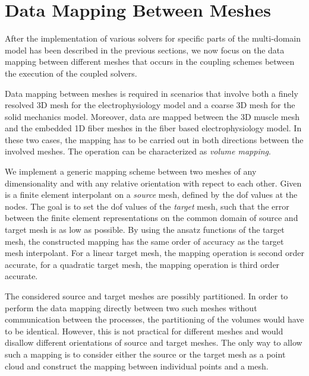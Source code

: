 
\section{Data Mapping Between Meshes}\label{sec:data_mapping_between_meshes}


After the implementation of various solvers for specific parts of the multi-domain model has been described in the previous sections, we now focus on the data mapping between different meshes that occurs in the coupling schemes between the execution of the coupled solvers. 

Data mapping between meshes is required in scenarios that involve both a finely resolved 3D mesh for the electrophysiology model and a coarse 3D mesh for the solid mechanics model. Moreover, data are mapped between the 3D muscle mesh and the embedded 1D fiber meshes in the fiber based electrophysiology model. In these two cases, the mapping has to be carried out in both directions between the involved meshes. The operation can be characterized as \emph{volume mapping}.

We implement a generic mapping scheme between two meshes of any dimensionality and with any relative orientation with repect to each other. 
Given is a finite element interpolant on a \emph{source} mesh, defined by the dof values at the nodes. The goal is to set the dof values of the \emph{target} mesh, such that the error between the finite element representations on the common domain of source and target mesh is as low as possible. By using the ansatz functions of the target mesh, the constructed mapping has the same order of accuracy as the target mesh interpolant. For a linear target mesh, the mapping operation is second order accurate, for a quadratic target mesh, the mapping operation is third order accurate.

The considered source and target meshes are possibly partitioned. In order to perform the data mapping directly between two such meshes without communication between the processes, the partitioning of the volumes would have to be identical. However, this is not practical for different meshes and would disallow different orientations of source and target meshes. The only way to allow such a mapping is to consider either the source or the target mesh as a point cloud and construct the mapping between individual points and a mesh.

